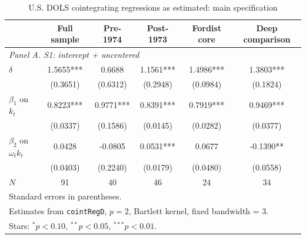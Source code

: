 \begin{table}[htbp]
\centering
\caption{U.S. DOLS cointegrating regressions as estimated: main specification}
\label{tab:us_dols_main_s1}
\small
\begin{tabular}{lccccc}
\hline
 & Full sample & Pre-1974 & Post-1973 & Fordist core & Deep comparison \\
\hline
\multicolumn{6}{l}{\textit{Panel A. S1: intercept + uncentered}} \\
$\delta$ & 1.5655*** & 0.6688 & 1.1561*** & 1.4986*** & 1.3803*** \\
 & (0.3651) & (0.6312) & (0.2948) & (0.0984) & (0.1824) \\
$\beta_1$ on $k_t$ & 0.8223*** & 0.9771*** & 0.8391*** & 0.7919*** & 0.9469*** \\
 & (0.0337) & (0.1586) & (0.0145) & (0.0282) & (0.0377) \\
$\beta_2$ on $\omega_t k_t$ & 0.0428 & -0.0805 & 0.0531*** & 0.0677 & -0.1390** \\
 & (0.0403) & (0.2240) & (0.0179) & (0.0480) & (0.0558) \\
$N$ & 91 & 40 & 46 & 24 & 34 \\
\hline
\multicolumn{6}{l}{\footnotesize Standard errors in parentheses.} \\
\multicolumn{6}{l}{\footnotesize Estimates from \texttt{cointRegD}, $p=2$, Bartlett kernel, fixed bandwidth = 3.} \\
\multicolumn{6}{l}{\footnotesize Stars: $^{*}p<0.10$, $^{**}p<0.05$, $^{***}p<0.01$.} \\
\end{tabular}
\end{table}
